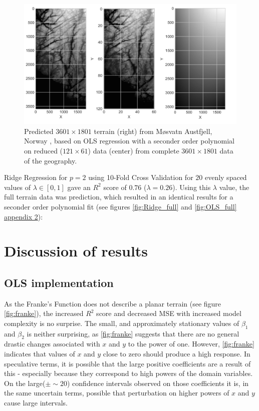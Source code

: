 \documentclass[%
oneside,                 %
final,                   %
10pt]{article}
\begin{document}
\begin{figure}[!h]
        \centering 
         \includegraphics[scale=0.4]{../Results/Part_g/predicted_compare.png} 
        \caption{Predicted $3601 \times 1801$  terrain (right) from Møsvatn Austfjell, Norway , based on OLS regression with a seconder order polynomial on reduced ($121 \times 61$) data (center) from complete $3601 \times 1801$ data of the geography.}
        \label{fig:compare_ols_pred_ter}   
\end{figure}  

Ridge Regression for $p=2$ using 10-Fold Cross Validation for $20$ evenly spaced values of $\lambda \in [0,1]$ gave an $R^2$ score of $0.76$ ($\lambda=0.26$). Using this $\lambda$ value, the full terrain data was prediction, which resulted in an identical results for a seconder order polynomial fit (see figures \ref{fig:Ridge_full} and \ref{fig:OLS_full} \hyperref[APP_1]{appendix 2}): 

\section{Discussion of results}
\subsection{OLS implementation}
As the Franke's Function does not describe a planar terrain (see figure \ref{fig:franke}), the increased $R^2$ score and decreased MSE with increased model complexity  is no surprise.  The small, and approximately stationary values of $\beta_1$ and $\beta_2$  is neither surprising, as \ref{fig:franke} suggests that there are no general drastic changes associated with $x$ and $y$ to the power of one. However, \ref{fig:franke} indicates that values of $x$ and $y$ close to zero should produce a high response. In speculative terms, it is possible that the large positive coefficients are a result of this - especially because they correspond to high powers of the domain variables. On the large($\pm \sim 20$) confidence intervals observed on those coefficients it is, in the same uncertain terms, possible that perturbation on higher powers of $x$ and $y$ cause large intervals. 
\end{document}
